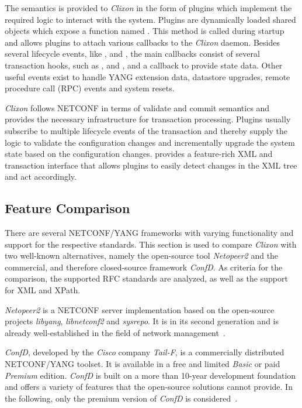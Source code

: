 The semantics is provided to \textit{Clixon} in the form of plugins which implement the required logic to interact with the system. Plugins are dynamically loaded shared objects which expose a function named . This method is called during startup and allows plugins to attach various callbacks to the \textit{Clixon} daemon. Besides several lifecycle events, like ,  and , the main callbacks consist of several transaction hooks, such as ,  and , and a callback to provide state data. Other useful events exist to handle YANG extension data, datastore upgrades, remote procedure call (RPC) events and system resets.

\textit{Clixon} follows NETCONF in terms of validate and commit semantics and provides the necessary infrastructure for transaction processing. Plugins usually subscribe to multiple lifecycle events of the transaction and thereby supply the logic to validate the configuration changes and incrementally upgrade the system state based on the configuration changes.  provides a feature-rich XML and transaction interface that allows plugins to easily detect changes in the XML tree and act accordingly.


\subsection{Feature Comparison}

There are several NETCONF/YANG frameworks with varying functionality and support for the respective standards. This section is used to compare \textit{Clixon} with two well-known alternatives, namely the open-source tool \textit{Netopeer2} and the commercial, and therefore closed-source framework \textit{ConfD}. As criteria for the comparison, the supported RFC standards are analyzed, as well as the support for XML and XPath.

\textit{Netopeer2} is a NETCONF server implementation based on the open-source projects \textit{libyang}, \textit{libnetconf2} and \textit{sysrepo}. It is in its second generation and is already well-established in the field of network management~\cite{netopeer2}.

\textit{ConfD}, developed by the \textit{Cisco} company \textit{Tail-F}, is a commercially distributed NETCONF/YANG toolset. It is available in a free and limited \textit{Basic} or paid \textit{Premium} edition. \textit{ConfD} is built on a more than 10-year development foundation and offers a variety of features that the open-source solutions cannot provide. In the following, only the premium version of \textit{ConfD} is considered~\cite{confd}.

